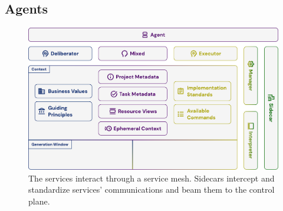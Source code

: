 \documentclass[a4paper,twocolumn,11pt]{quantumarticle}
\begin{document}
\subsection{Agents}
\begin{figure}[t]
  \centering
  \includegraphics[width=\textwidth]{figures/agent.pdf}
  \caption{The services interact through a service mesh. Sidecars intercept and standardize services' communications and beam them to the control plane.}
  \label{fig:agent}
\end{figure}


\end{document}
